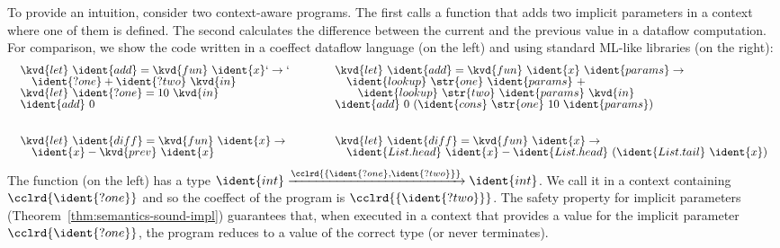 To provide an intuition, consider two context-aware programs. The first calls a function that
adds two implicit parameters in a context where one of them is defined. The second calculates
the difference between the current and the previous value in a dataflow computation.
For comparison, we show the code written in a coeffect dataflow language (on the left) and
using standard ML-like libraries (on the right):
%
\begin{equation*}
\begin{array}{lcl}
\begin{array}{l}
\kvd{let}~\ident{add}=\kvd{fun}~\ident{x}`\rightarrow`\\[-0.2em]
 \quad \ident{?one} + \ident{?two}~\kvd{in}\\[-0.2em]
\kvd{let}~\ident{?one} = 10~\kvd{in}\\[-0.2em]
\ident{add}~0
\end{array}
&\quad&
\begin{array}{l}
\kvd{let}~\ident{add}=\kvd{fun}~\ident{x}~\ident{params}\rightarrow\\[-0.2em]
 \quad \ident{lookup}~\str{one}~\ident{params}~+ \\[-0.2em]
 \quad\quad \ident{lookup}~\str{two}~\ident{params}~\kvd{in}\\[-0.2em]
\ident{add}~0~(\ident{cons}~\str{one}~10~\ident{params})
\end{array}
\\[3.5em]
\begin{array}{l}
\kvd{let}~\ident{diff}=\kvd{fun}~\ident{x}\rightarrow\\[-0.2em]
 \quad \ident{x}-\kvd{prev}~\ident{x}
\end{array}
&&
\begin{array}{l}
\kvd{let}~\ident{diff}=\kvd{fun}~\ident{x}\rightarrow\\[-0.2em]
 \quad \ident{List.head}~\ident{x}-\ident{List.head}~(\ident{List.tail}~\ident{x})
\end{array}
\end{array}
\end{equation*}
%
The  function (on the left) has a type $\ident{int}\xrightarrow{\cclrd{ \{ \ident{?one},\ident{?two} \} }}\ident{int}$.
We call it in a context containing $\cclrd{\ident{?one}}$ and so the coeffect of the program is
$\cclrd{ \{ \ident{?two} \} }$. The safety property for implicit parameters
(Theorem~\ref{thm:semantics-sound-impl}) guarantees that, when executed in a context that
provides a value for the implicit parameter $\cclrd{\ident{?one}}$, the program reduces to
a value of the correct type (or never terminates).

